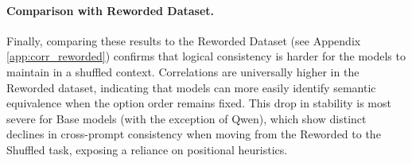 \vspace{-0.4cm}
\paragraph{Comparison with Reworded Dataset.}
Finally, comparing these results to the Reworded Dataset (see Appendix \ref{app:corr_reworded}) confirms that logical consistency is harder for the models to maintain in a shuffled context. Correlations are universally higher in the Reworded dataset, indicating that models can more easily identify semantic equivalence when the option order remains fixed. This drop in stability is most severe for Base models (with the exception of Qwen), which show distinct declines in cross-prompt consistency when moving from the Reworded to the Shuffled task, exposing a reliance on positional heuristics.
